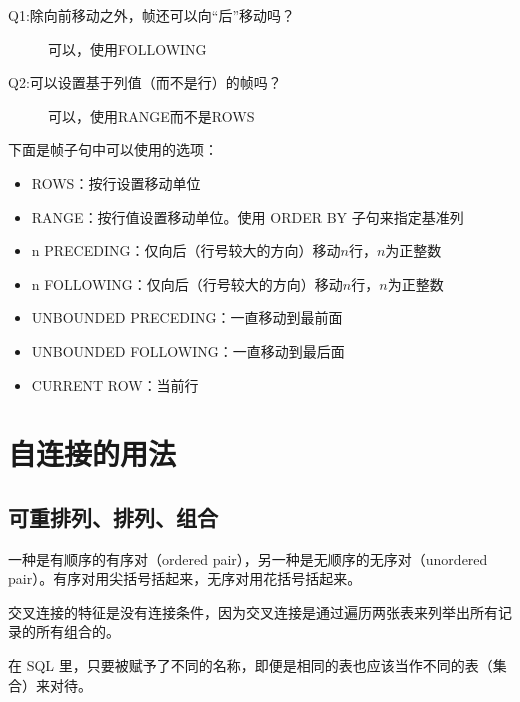 
\begin{description}
    \item[Q1:除向前移动之外，帧还可以向“后”移动吗？] 可以，使用\textsf{FOLLOWING}
    \item[Q2:可以设置基于列值（而不是行）的帧吗？] 可以，使用\textsf{RANGE}而不是\textsf{ROWS}
\end{description}

下面是帧子句中可以使用的选项：
\begin{itemize}
    \item \textsf{ROWS}：按行设置移动单位
    \item \textsf{RANGE}：按行值设置移动单位。使用 ORDER BY 子句来指定基准列
    \item \textsf{n PRECEDING}：仅向后（行号较大的方向）移动$n$行，$n$为正整数
    \item \textsf{n FOLLOWING}：仅向后（行号较大的方向）移动$n$行，$n$为正整数
    \item \textsf{UNBOUNDED PRECEDING}：一直移动到最前面
    \item \textsf{UNBOUNDED FOLLOWING}：一直移动到最后面
    \item \textsf{CURRENT ROW}：当前行
\end{itemize}

\section{自连接的用法}
\subsection{可重排列、排列、组合}
一种是有顺序的有序对（ordered pair），另一种是无顺序的无序对（unordered pair）。有序对用尖括号括起来，无序对用花括号括起来。

交叉连接的特征是没有连接条件，因为交叉连接是通过遍历两张表来列举出所有记录的所有组合的。

在 SQL 里，只要被赋予了不同的名称，即便是相同的表也应该当作不同的表（集合）来对待。